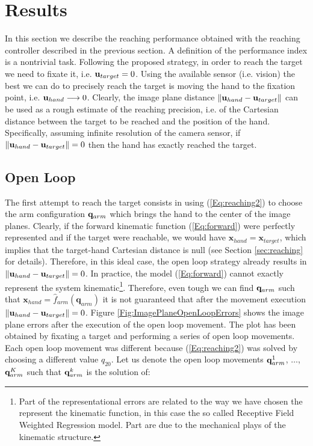 \section{Results}
\label{sec:results}

In this section we describe the reaching performance obtained with 
the reaching controller described in the previous section. A definition of 
the performance 
index is a nontrivial task. Following the proposed strategy, in order to reach the 
target we need to fixate it, i.e. $\mathbf{u}_{target} = 0$. Using the available sensor (i.e. vision) the best we can do to precisely reach the target is moving the hand to the fixation point, i.e. $
{\mathbf{u}_{hand}} \longrightarrow 0$. Clearly, the image plane distance $\| \mathbf{u}_{hand} - \mathbf{u}_{target} \|$ can be used as a rough estimate of the reaching precision, i.e. of the Cartesian distance between the target to be reached and the position of the hand. Specifically, assuming infinite resolution of the camera sensor, if $\| \mathbf{u}_{hand} - \mathbf{u}_{target}\| = 0$ then the hand has exactly reached the target.

\subsection{Open Loop}
The first attempt to reach the target consists in using (\ref{Eq:reaching2})
to choose the arm configuration $\mathbf q_{arm}$ which brings the hand to the center 
of the image planes. Clearly, if the forward 
kinematic function (\ref{Eq:forward}) were perfectly represented and if the target were reachable, we would have $\mathbf x_{hand} =  \mathbf x_{target}$, which implies that the target-hand Cartesian distance 
 is null (see Section \ref{sec:reaching} for details). Therefore, in this ideal case, the open loop 
 strategy already results in $\| \mathbf{u}_{hand} - \mathbf{u}_{target} \| = 0$. In practice, the model 
 (\ref{Eq:forward}) cannot exactly represent the system kinematic\footnote{Part of the representational 
 errors are related to the way we have chosen the represent the kinematic function, in this case the
 so called Receptive Field Weighted Regression model. Part are due to the mechanical plays of the
 kinematic structure.}. Therefore, even tough we can find $\mathbf q_{arm}$ such that $\mathbf x_{hand}=
 \hat f_{arm}(\mathbf q_{arm})$ it is not guaranteed that after the movement execution 
 $\| \mathbf{u}_{hand} - \mathbf{u}_{target} \| = 0$. Figure \ref{Fig:ImagePlaneOpenLoopErrors}
 shows the image plane errors after the execution of the open loop movement. The plot has been obtained
 by fixating a target and performing a series of open loop movements. Each open loop
 movement was different because (\ref{Eq:reaching2}) was solved 
 by choosing a different value $q_{20}$. Let us denote the open loop movements $\mathbf q_{arm}^1$, $\dots$, 
 $\mathbf q_{arm}^K$ such that $\mathbf q_{arm}^k$ is the solution of:
 

